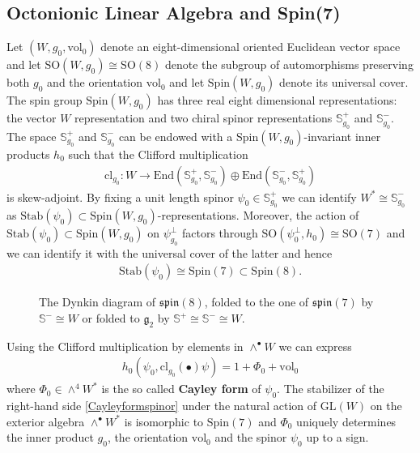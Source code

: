 \documentclass[psamsfonts]{amsart}
\theoremstyle{plain}
\theoremstyle{definition}{
\newtheorem{defi}{Definition}[section]
\newtheorem{ass}{Assumption}
\newtheorem*{nota}{Notation}}
\theoremstyle{remark}{
\newtheorem{rem}{Remark}
\newtheorem{ex}{Example}}
\theoremstyle{plain}{
\newtheorem{thm}{Theorem}[section]
\newtheorem{lem}{Lemma}[section]
\newtheorem{cor}{Corollary}[section]
\newtheorem{prop}{Proposition}[section]
\newtheorem{con}{Conjecture}[section]}
\newcommand{\m}[1]{{\mathrm{#1}}}
\begin{document}
\subsection{Octonionic Linear Algebra and Spin(7)}
\label{Octonionic Linear Algebra and Spin(7)}

Let $(W,g_0,\m{vol}_0)$ denote an eight-dimensional oriented Euclidean vector space and let $\m{SO}(W,g_0)\cong\m{SO}(8)$ denote the subgroup of automorphisms preserving both $g_0$ and the orientation $\m{vol}_0$ and let $\m{Spin}(W,g_0)$ denote its universal cover. The spin group $\m{Spin}(W,g_0)$ has three real eight dimensional representations: the vector $W$ representation and two chiral spinor representations 
$\mathbb{S}^+_{g_0}$ and $\mathbb{S}^-_{g_0}$. The space $\mathbb{S}^+_{g_0}$ and $\mathbb{S}^-_{g_0}$ can be endowed with a $\m{Spin}(W,g_0)$-invariant inner products $h_0$ such that the Clifford multiplication 
\begin{align*}
    \m{cl}_{g_0}\colon W\rightarrow\m{End}(\mathbb{S}^+_{g_0},\mathbb{S}^-_{g_0})\oplus \m{End}(\mathbb{S}^-_{g_0},\mathbb{S}^+_{g_0})
\end{align*}
is skew-adjoint. By fixing a unit length spinor $\psi_{0}\in \mathbb{S}^+_{g_0}$ we can identify $ W^*\cong \mathbb{S}^-_{g_0}$ as $\m{Stab}(\psi_{0})\subset \m{Spin}(W,g_0)$-representations. Moreover, the action of $\m{Stab}(\psi_0)\subset \m{Spin}(W,g_0)$ on $\psi^\perp_{g_0}$ factors through $\m{SO}(\psi^\perp_{0},h_0)\cong \m{SO}(7)$ and we can identify it with the universal cover of the latter and hence 
\begin{align*}
    \m{Stab}(\psi_0)\cong \m{Spin}(7)\subset \m{Spin}(8).
\end{align*}


\begin{figure}[h!]
\centering
{}
\caption{The Dynkin diagram of $\mathfrak{spin}(8)$, folded to the one of $\mathfrak{spin}(7)$ by $\mathbb{S}^-\cong W$ or folded to $\mathfrak{g}_2$ by $\mathbb{S}^+\cong \mathbb{S}^-\cong W$.}
\end{figure}

Using the Clifford multiplication by elements in $\wedge^\bullet W$ we can express 
\begin{align}
\label{Cayleyformspinor}
    h_0(\psi_0,\m{cl}_{g_0}(\bullet)\psi)=1+\Phi_0+\m{vol}_{0}
\end{align}
where $\Phi_0\in \wedge^4W^*$ is the so called \textbf{Cayley form} of $\psi_0$. The stabilizer of the right-hand side \eqref{Cayleyformspinor} under the natural action of $\m{GL}(W)$ on the exterior algebra $\wedge^\bullet W^*$ is isomorphic to $\m{Spin}(7)$ and $\Phi_0$ uniquely determines the inner product $g_0$, the orientation $\m{vol}_0$ and the spinor $\psi_0$ up to a sign.\\
\end{document}
